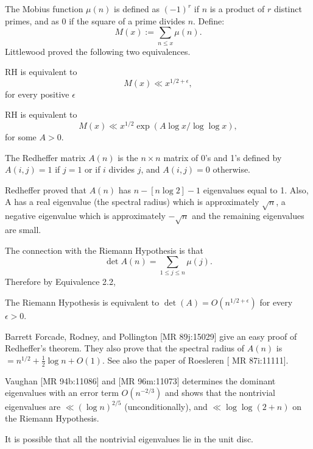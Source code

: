 \documentclass[12pt,letterpaper, reqno]{amsart}
\begin{document}
\begin{problemblock}
The Mobius function $\mu (n)$ is defined as $(-1)^r$ if
$n$ is a product of $r$ distinct primes, and as $0$ if the
square of a prime divides $n$. Define:
$$
M(x) := \sum_{n \leq x} \mu (n).
$$
Littlewood proved the following two equivalences.
\begin{rhequivalence}[2.2]
RH is equivalent to
$$
M (x) \ll x^{1/2 + \epsilon},
$$
for every positive $\epsilon$
\end{rhequivalence}
\end{problemblock}

\begin{problemblock}
\begin{rhequivalence}[2.25]
RH is equivalent to
$$
M (x) \ll x^{1/2} \exp (A \log x/\log\log x),
$$
for some $A>0$.
\end{rhequivalence}
\end{problemblock}

\begin{problemblock}
The Redheffer matrix $A(n)$ is the $n\times n$  matrix of 0's and 1's
defined by $A(i,j) = 1$ if $j = 1$ or if $i$ divides $j$, and
$A(i,j) = 0$ otherwise.

Redheffer proved that $A(n)$ has $ n-[n \log 2]-1$ eigenvalues equal to 1.
Also,     A has a real eigenvalue  (the spectral radius) which is approximately $\sqrt{n}$,
     a negative eigenvalue which is approximately $-\sqrt{n}$ and
     the remaining eigenvalues are small.

The connection with the Riemann Hypothesis is that
$$
\det A(n) = \sum_{1\le j\le n} \mu(j) .
$$
Therefore by Equivalence 2.2,
\begin{rhequivalence}[2.3] The Riemann Hypothesis is equivalent to
$\det(A) = O(n^{1/2+\epsilon})$ for every $\epsilon > 0$.
\end{rhequivalence}

\begin{remark}

Barrett  Forcade, Rodney, and Pollington
[MR 89j:15029]  give an easy proof of Redheffer's theorem.
They also prove that the spectral radius of $A(n)$ is
$=n^{1/2}+\tfrac 12\log n+O(1).$  See also the paper of
Roesleren [ MR 87i:11111].
\end{remark}


\begin{remark}

Vaughan [MR 94b:11086] and [MR 96m:11073]
determines the dominant eigenvalues with an error term $O(n^{-2/3})$ and shows that the nontrivial eigenvalues are  $\ll(\log n)^{2/5}$ (unconditionally), and $\ll\log\log(2+n)$ on the Riemann Hypothesis.
\end{remark}

\begin{remark}
It is possible that all the nontrivial eigenvalues lie in the unit disc.
\end{remark}
\end{problemblock}
\end{document}

